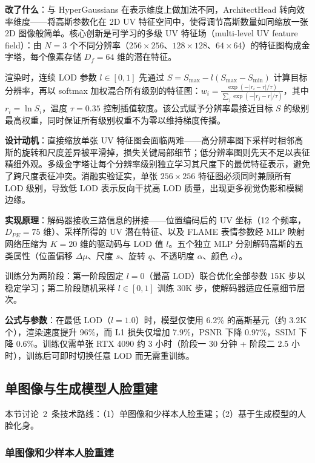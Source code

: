 \textbf{改了什么}：与 HyperGaussians 在表示维度上做加法不同，ArchitectHead 转向效率维度——将高斯参数化在 2D UV 特征空间中，使得调节高斯数量如同缩放一张 2D 图像般简单。核心创新是可学习的多级 UV 特征场（multi-level UV feature field）：由 $N=3$ 个不同分辨率（$256\times256$、$128\times128$、$64\times64$）的特征图构成金字塔，每个像素存储 $D_f=64$ 维的潜在特征。

渲染时，连续 LOD 参数 $l \in [0, 1]$ 先通过 $S = S_{\max} - l(S_{\max} - S_{\min})$ 计算目标分辨率，再以 softmax 加权混合所有级别的特征图：$w_i = \frac{\exp(-|r_i - r|/\tau)}{\sum_j \exp(-|r_j - r|/\tau)}$，其中 $r_i = \ln S_i$，温度 $\tau=0.35$ 控制插值软度。该公式赋予分辨率最接近目标 $S$ 的级别最高权重，同时保证所有级别权重不为零以维持梯度传播。

\textbf{设计动机}：直接缩放单张 UV 特征图会面临两难——高分辨率图下采样时相邻高斯的旋转和尺度差异被平滑掉，损失关键局部细节；低分辨率图则先天不足以表征精细外观。多级金字塔让每个分辨率级别独立学习其尺度下的最优特征表示，避免了跨尺度表征冲突。消融实验证实，单张 $256\times256$ 特征图必须同时兼顾所有 LOD 级别，导致低 LOD 表示反向干扰高 LOD 质量，出现更多视觉伪影和模糊边缘。

\textbf{实现原理}：解码器接收三路信息的拼接——位置编码后的 UV 坐标（12 个频率，$D_{PE}=75$ 维）、采样所得的 UV 潜在特征、以及 FLAME 表情参数经 MLP 映射网络压缩为 $K=20$ 维的驱动码与 LOD 值 $l$。五个独立 MLP 分别解码高斯的五类属性（位置偏移 $\Delta\mu$、尺度 $s$、旋转 $q$、不透明度 $\alpha$、颜色 $c$）。

训练分为两阶段：第一阶段固定 $l=0$（最高 LOD）联合优化全部参数 15K 步以稳定学习；第二阶段随机采样 $l \in [0, 1]$ 训练 30K 步，使解码器适应任意细节层次。

\textbf{公式与参数}：在最低 LOD（$l=1.0$）时，模型仅使用 6.2\% 的高斯基元（约 3.2K 个），渲染速度提升 96\%，而 L1 损失仅增加 7.9\%，PSNR 下降 0.97\%，SSIM 下降 0.6\%。训练仅需单张 RTX 4090 约 3 小时（阶段一 30 分钟 + 阶段二 2.5 小时），训练后可即时切换任意 LOD 而无需重训练。

\subsection{单图像与生成模型人脸重建}
\label{ss:16_1b}

本节讨论~2~条技术路线：（1）单图像和少样本人脸重建；（2）基于生成模型的人脸化身。

\subsubsection{单图像和少样本人脸重建}

